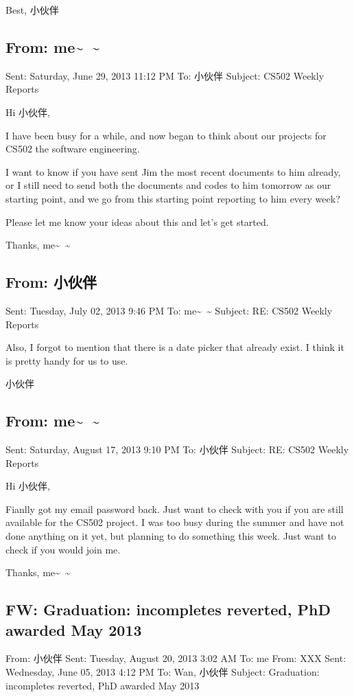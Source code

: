 \documentclass[12pt]{book}
\begin{document}
Best,
小伙伴

\subsection{From: me\textasciitilde{}~\textasciitilde{}}
\label{sec-7-1-2}
Sent: Saturday, June 29, 2013 11:12 PM
To: 小伙伴
Subject: CS502 Weekly Reports

Hi 小伙伴,

I have been busy for a while, and now began to think about our projects for CS502 the software engineering.

I want to know if you have sent Jim the most recent documents to him already, or I still need to send both the documents and codes to him tomorrow as our starting point, and we go from this starting point reporting to him every week?

Please let me know your ideas about this and let's get started.

Thanks,
me\textasciitilde{}~\textasciitilde{}

\subsection{From: 小伙伴}
\label{sec-7-1-3}
Sent: Tuesday, July 02, 2013 9:46 PM
To: me\textasciitilde{}~\textasciitilde{}
Subject: RE: CS502 Weekly Reports

Also, I forgot to mention that there is a date picker that already exist. I think it is pretty handy for us to use.

小伙伴

\subsection{From: me\textasciitilde{}~\textasciitilde{}}
\label{sec-7-1-4}
Sent: Saturday, August 17, 2013 9:10 PM
To: 小伙伴
Subject: RE: CS502 Weekly Reports

Hi 小伙伴,

Fianlly got my email password back. Just want to check with you if you are still available for the CS502 project. I was too busy during the summer and have not done anything on it yet, but planning to do something this week. Just want to check if you would join me.

Thanks,
me\textasciitilde{}~\textasciitilde{}

\subsection{FW: Graduation: incompletes reverted, PhD awarded May 2013}
\label{sec-7-1-5}
From: 小伙伴
Sent: Tuesday, August 20, 2013 3:02 AM
To: me
From: XXX
Sent: Wednesday, June 05, 2013 4:12 PM
To: Wan, 小伙伴
Subject: Graduation: incompletes reverted, PhD awarded May 2013
\end{document}
